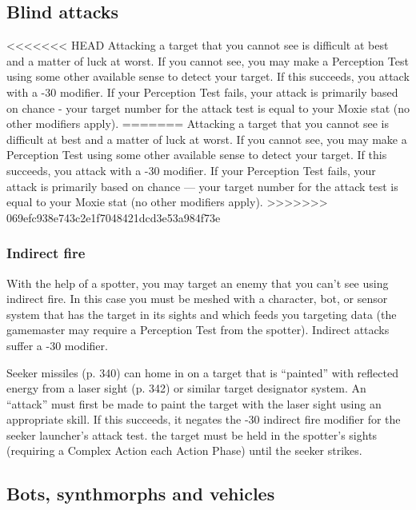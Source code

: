 \subsection{Blind attacks} \label{sec:blind-attacks} 

<<<<<<< HEAD Attacking a target that you cannot see is difficult at best and a matter of luck at worst. If you cannot see, you may make a Perception Test using some other available sense to detect your target. If this succeeds, you attack with a -30 modifier. If your Perception Test fails, your attack is primarily based on chance - your target number for the attack test is equal to your Moxie stat (no other modifiers apply). ======= Attacking a target that you cannot see is difficult at best and a matter of luck at worst. If you cannot see, you may make a Perception Test using some other available sense to detect your target. If this succeeds, you attack with a -30 modifier. If your Perception Test fails, your attack is primarily based on chance --- your target number for the attack test is equal to your Moxie stat (no other modifiers apply). >>>>>>> 069efc938e743c2e1f7048421dcd3e53a984f73e 

\subsubsection{Indirect fire} 

With the help of a spotter, you may target an enemy that you can’t see using indirect fire. In this case you must be meshed with a character, bot, or sensor system that has the target in its sights and which feeds you targeting data (the gamemaster may require a Perception Test from the spotter). Indirect attacks suffer a -30 modifier. 

Seeker missiles (p. 340) can home in on a target that is ``painted'' with reflected energy from a laser sight (p. 342) or similar target designator system. An ``attack'' must first be made to paint the target with the laser sight using an appropriate skill. If this succeeds, it negates the -30 indirect fire modifier for the seeker launcher’s attack test. the target must be held in the spotter’s sights (requiring a Complex Action each Action Phase) until the seeker strikes. 



\subsection{Bots, synthmorphs and vehicles} \label{sec:bots-synthmorphs-vehicles} 

